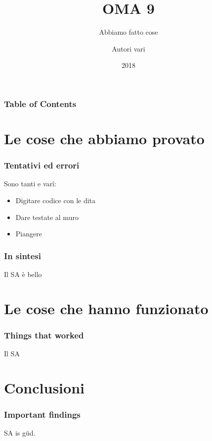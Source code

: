 \documentclass[a4paper]{beamer}
\title[The title]{OMA 9}
\subtitle{Abbiamo fatto cose}
\author{Autori vari}
\institute{Politecnico di Torino}
\date{2018}
\begin{document}
	
	\frame{\titlepage}
	
	\begin{frame}
		\frametitle{Table of Contents}
		\tableofcontents
	\end{frame}
	
	\section{Le cose che abbiamo provato}
	
	\begin{frame}
		\frametitle{Tentativi ed errori}
		Sono tanti e var\^i:
		\begin{itemize}
			\item Digitare codice con le dita
			\item Dare testate al muro
			\item Piangere
		\end{itemize}
	\end{frame}

	\begin{frame}
		\frametitle{In sintesi}
		Il SA è bello
	\end{frame}

	\section{Le cose che hanno funzionato}
	
	\begin{frame}
		\frametitle{Things that worked}
		Il SA
	\end{frame}

	\section{Conclusioni}
	
	\begin{frame}
		\frametitle{Important findings}
		SA is g\"ud.
	\end{frame}
\end{document}
